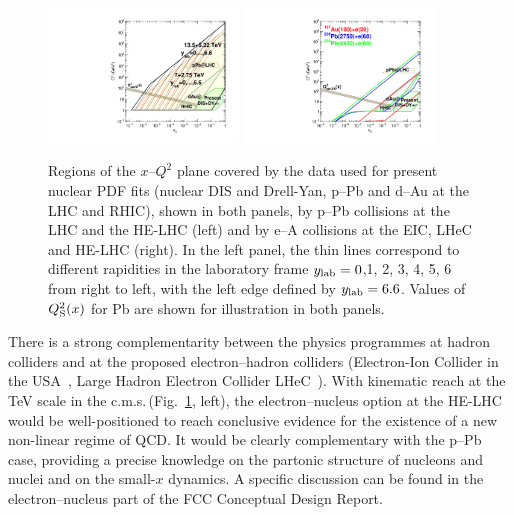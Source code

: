 \documentclass[../report.tex]{subfiles}
\begin{document}
\begin{figure}[h]
\centering
\includegraphics[width=0.45\textwidth]{helhc/figs/HELHC1.pdf}
\includegraphics[width=0.45\textwidth]{helhc/figs/HELHC2.pdf}
\caption{Regions of the $x$--$Q^2$ plane covered by the data used for present nuclear PDF fits
(nuclear DIS and Drell-Yan, p--Pb and d--Au at the LHC and RHIC), shown in both panels, by p--Pb collisions at the LHC and the HE-LHC (left) 
and by e--A collisions at the EIC, LHeC and HE-LHC (right). In the left panel, the thin lines correspond to different rapidities in the
laboratory frame $y_{\rm lab} = 0$,1, 2, 3, 4, 5, 6 from right to left, with the left edge defined by $y_{\rm lab} = 6.6$. Values of $Q^2_{\rm S}(x)$ for Pb are shown for illustration in both panels.}
\label{fig:kinplane}
\end{figure}


There is a strong complementarity between the physics programmes at hadron colliders
and at the proposed electron--hadron colliders (Electron-Ion Collider in the USA~\cite{Accardi:2012qut}, Large Hadron Electron Collider LHeC~\cite{AbelleiraFernandez:2012cc}).
With kinematic reach at the TeV scale in the c.m.s.\,(Fig.~\ref{fig:kinplane}, left), 
the electron--nucleus option at the HE-LHC would be well-positioned to reach conclusive evidence for the existence of a new non-linear regime of QCD. It would be clearly complementary with the p--Pb case, providing a precise knowledge on the partonic structure of nucleons and nuclei and on the small-$x$ dynamics. A specific discussion can be found in the electron--nucleus part of the FCC Conceptual Design Report.


\end{document}
